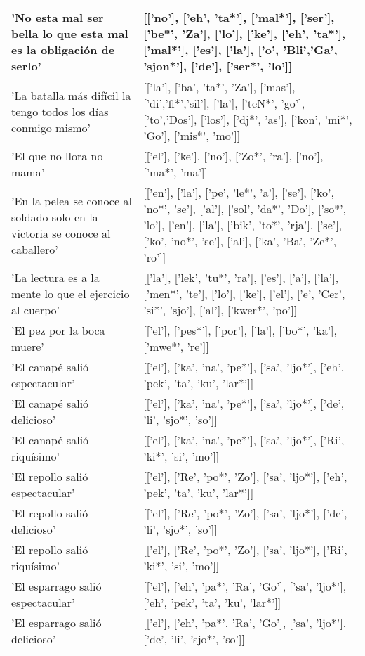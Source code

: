 \begin{longtable}{| p{} | p{} |}
'No esta mal ser bella lo que esta mal es la obligación de serlo' & [['no'], ['eh', 'ta*'], ['mal*'], ['ser'], ['be*', 'Za'], ['lo'], ['ke'], ['eh', 'ta*'], ['mal*'], ['es'], ['la'], ['o', 'Bli','Ga', 'sjon*'], ['de'], ['ser*', 'lo']] \\ \hline
'La batalla más difícil la tengo todos los días conmigo mismo' & [['la'], ['ba', 'ta*', 'Za'], ['mas'], ['di','fi*','sil'], ['la'], ['teN*', 'go'], ['to','Dos'], ['los'], ['dj*', 'as'], ['kon', 'mi*', 'Go'], ['mis*', 'mo']] \\ \hline
'El que no llora no mama' & [['el'], ['ke'], ['no'], ['Zo*', 'ra'], ['no'], ['ma*', 'ma']] \\ \hline
'En la pelea se conoce al soldado solo en la victoria se conoce al caballero' & [['en'], ['la'], ['pe', 'le*', 'a'], ['se'], ['ko', 'no*', 'se'], ['al'], ['sol', 'da*', 'Do'], ['so*', 'lo'], ['en'], ['la'], ['bik', 'to*', 'rja'], ['se'], ['ko', 'no*', 'se'], ['al'], ['ka', 'Ba', 'Ze*', 'ro']] \\ \hline
'La lectura es a la mente lo que el ejercicio al cuerpo' & [['la'], ['lek', 'tu*', 'ra'], ['es'], ['a'], ['la'], ['men*', 'te'], ['lo'], ['ke'], ['el'], ['e', 'Cer', 'si*', 'sjo'], ['al'], ['kwer*', 'po']] \\ \hline
'El pez por la boca muere' & [['el'], ['pes*'], ['por'], ['la'], ['bo*', 'ka'], ['mwe*', 're']] \\ \hline
'El canapé salió espectacular' & [['el'], ['ka', 'na', 'pe*'], ['sa', 'ljo*'], ['eh', 'pek', 'ta', 'ku', 'lar*']] \\ \hline
'El canapé salió delicioso' & [['el'], ['ka', 'na', 'pe*'], ['sa', 'ljo*'], ['de', 'li', 'sjo*', 'so']] \\ \hline
'El canapé salió riquísimo' & [['el'], ['ka', 'na', 'pe*'], ['sa', 'ljo*'], ['Ri', 'ki*', 'si', 'mo']] \\ \hline
'El repollo salió espectacular' & [['el'], ['Re', 'po*', 'Zo'], ['sa', 'ljo*'], ['eh', 'pek', 'ta', 'ku', 'lar*']] \\ \hline
'El repollo salió delicioso' & [['el'], ['Re', 'po*', 'Zo'], ['sa', 'ljo*'], ['de', 'li', 'sjo*', 'so']] \\ \hline
'El repollo salió riquísimo' & [['el'], ['Re', 'po*', 'Zo'], ['sa', 'ljo*'], ['Ri', 'ki*', 'si', 'mo']] \\ \hline
'El esparrago salió espectacular' & [['el'], ['eh', 'pa*', 'Ra', 'Go'], ['sa', 'ljo*'], ['eh', 'pek', 'ta', 'ku', 'lar*']] \\ \hline
'El esparrago salió delicioso' & [['el'], ['eh', 'pa*', 'Ra', 'Go'], ['sa', 'ljo*'], ['de', 'li', 'sjo*', 'so']] \\ \hline

\end{longtable}
